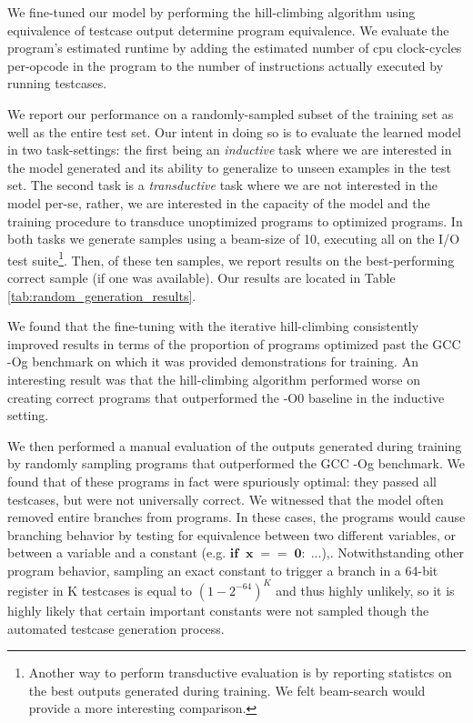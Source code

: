 \documentclass{article}
\begin{document}

We fine-tuned our model by performing the hill-climbing algorithm using equivalence of testcase output determine program equivalence. We evaluate the program's estimated runtime by adding the estimated number of cpu clock-cycles per-opcode in the program to the number of instructions actually executed by running testcases. 

We report our performance on a randomly-sampled subset of the training set as well as the entire test set. Our intent in doing so is to evaluate the learned model in two task-settings: the first being an \textit{inductive} task where we are interested in the model generated and its ability to generalize to unseen examples in the test set. The second task is a \textit{transductive} task where we are not interested in the model per-se, rather, we are interested in the capacity of the model and the training procedure to transduce unoptimized programs to optimized programs. In both tasks we generate samples using a beam-size of 10, executing all on the I/O test suite\footnote{Another way to perform transductive evaluation is by reporting statistcs on the best outputs generated during training. We felt beam-search would provide a more interesting comparison.}. Then, of these ten samples, we report results on the best-performing correct sample (if one was available). Our results are located in Table \ref{tab:random_generation_results}. 

We found that the fine-tuning with the iterative hill-climbing consistently improved results in terms of the proportion of programs optimized past the GCC -Og benchmark on which it was provided demonstrations for training. An interesting result was that the hill-climbing algorithm performed worse on creating correct programs that outperformed the -O0 baseline in the inductive setting. 

We then performed a manual evaluation of the outputs generated during training by randomly sampling  programs that outperformed the GCC -Og benchmark. We found that  of these programs in fact were spuriously optimal: they passed all testcases, but were not universally correct. We witnessed that the model often removed entire branches from programs. 
In these cases, the programs would cause branching behavior by testing for equivalence between two different variables, or between a variable and a constant (e.g. $\textbf{if} \;\; \mathbf{x\;==\;0:\; ...}$),. Notwithstanding other program behavior, sampling an exact constant to trigger a branch in a 64-bit register in K testcases is equal to $(1-2^{-64})^K$ and thus highly unlikely, so it is highly likely that certain important constants were not sampled though the automated testcase generation process.
\end{document}
